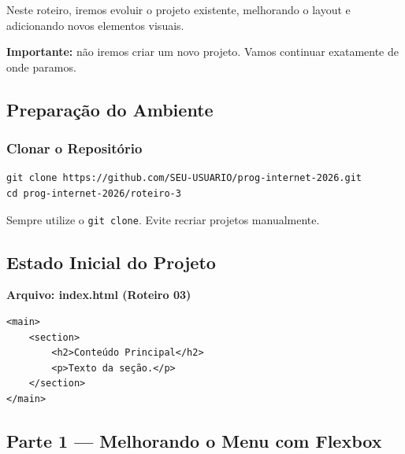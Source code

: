 \documentclass[12pt,a4paper]{article}
\begin{document}
Neste roteiro, iremos evoluir o projeto existente, melhorando o layout e adicionando novos elementos visuais.

\textbf{Importante:} não iremos criar um novo projeto. Vamos continuar exatamente de onde paramos.


\subsection{Preparação do Ambiente}

\subsubsection{Clonar o Repositório}

\begin{boxCodigo}
\begin{verbatim}
git clone https://github.com/SEU-USUARIO/prog-internet-2026.git
cd prog-internet-2026/roteiro-3
\end{verbatim}
\end{boxCodigo}

\begin{boxDica}
Sempre utilize o \texttt{git clone}.  
Evite recriar projetos manualmente.
\end{boxDica}


\subsection{Estado Inicial do Projeto}

\textbf{Arquivo: index.html (Roteiro 03)}

\begin{boxCodigo}
\begin{verbatim}
<main>
    <section>
        <h2>Conteúdo Principal</h2>
        <p>Texto da seção.</p>
    </section>
</main>
\end{verbatim}
\end{boxCodigo}


\subsection{Parte 1 — Melhorando o Menu com Flexbox}
\end{document}
